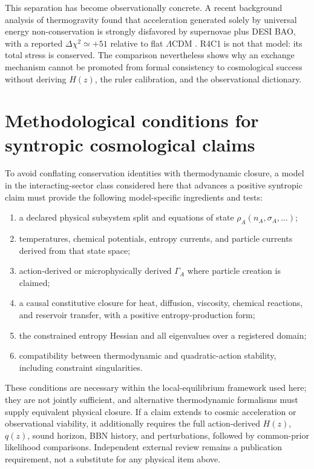 \documentclass[aps,prd,reprint,superscriptaddress,nofootinbib,floatfix]{revtex4-2}
\begin{document}
This separation has become observationally concrete.  A recent background
analysis of thermogravity found that acceleration generated solely by universal
energy non-conservation is strongly disfavored by supernovae plus DESI BAO,
with a reported \(\Delta\chi^2\simeq+51\) relative to flat
\(\Lambda\)CDM \cite{lee2026}.  R4C1 is not that model: its total stress is
conserved.  The comparison nevertheless shows why an exchange mechanism
cannot be promoted from formal consistency to cosmological success without
deriving \(H(z)\), the ruler calibration, and the observational dictionary.

\section{Methodological conditions for syntropic cosmological claims}
\label{sec:programme}

To avoid conflating conservation identities with thermodynamic closure, a
model in the interacting-sector class considered here that advances a positive
syntropic claim must provide the following model-specific ingredients and
tests:
\begin{enumerate}
\item a declared physical subsystem split and equations of state
\(\rho_A(n_A,\sigma_A,\ldots)\);
\item temperatures, chemical potentials, entropy currents, and particle
currents derived from that state space;
\item action-derived or microphysically derived \(\Gamma_A\) where particle
creation is claimed;
\item a causal constitutive closure for heat, diffusion, viscosity, chemical
reactions, and reservoir transfer, with a positive entropy-production form;
\item the constrained entropy Hessian and all eigenvalues over a registered
domain;
\item compatibility between thermodynamic and quadratic-action stability,
including constraint singularities.
\end{enumerate}

These conditions are necessary within the local-equilibrium framework used
here; they are not jointly sufficient, and alternative thermodynamic
formalisms must supply equivalent physical closure.  If a claim extends to
cosmic acceleration or observational viability, it additionally requires the
full action-derived \(H(z)\), \(q(z)\), sound horizon, BBN history, and
perturbations, followed by common-prior likelihood comparisons.  Independent
external review remains a publication requirement, not a substitute for any
physical item above.
\end{document}
